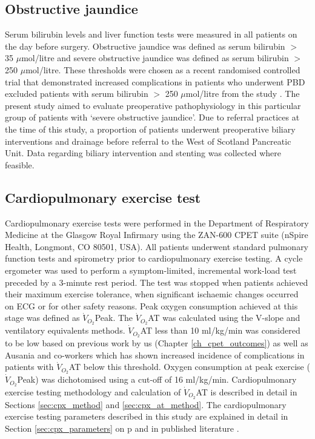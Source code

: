 \subsection{Obstructive jaundice}
Serum bilirubin levels and liver function tests were measured in all patients on the day before surgery. 
Obstructive jaundice was defined as serum bilirubin $>$ 35 $\mu$mol/litre and severe obstructive jaundice was defined as serum bilirubin $>$ 250 $\mu$mol/litre. 
These thresholds were chosen as a recent randomised controlled trial that demonstrated increased complications in patients who underwent PBD excluded patients with serum bilirubin $>$ 250 $\mu$mol/litre from the study \parencite{van_der_gaag_preoperative_2010}.
The present study aimed to evaluate preoperative pathophysiology in this particular group of patients with `severe obstructive jaundice'.
Due to referral practices at the time of this study, a proportion of patients underwent preoperative biliary interventions and drainage before referral to the West of Scotland Pancreatic Unit. 
Data regarding biliary intervention and stenting was collected where feasible.

\subsection{Cardiopulmonary exercise test}
Cardiopulmonary exercise tests were performed in the Department of Respiratory Medicine at the Glasgow Royal Infirmary using the ZAN-600 CPET suite (nSpire Health, Longmont, CO 80501, USA). 
All patients underwent standard pulmonary function tests and spirometry prior to cardiopulmonary exercise testing. 
A cycle ergometer was used to perform a symptom-limited, incremental work-load test preceded by a 3-minute rest period. 
The test was stopped when patients achieved their maximum exercise tolerance, when significant ischaemic changes occurred on ECG or for other safety reasons. 
Peak oxygen consumption achieved at this stage was defined as $\dot{V}_{O_2}$Peak. 
The $\dot{V}_{O_2}$AT was calculated using the V-slope \parencite{beaver_new_1986,sue_metabolic_1988} and ventilatory equivalents \parencite{_ats/accp_2003} methods.
$\dot{V}_{O_2}$AT less than 10 ml/kg/min was considered to be low based on previous work by us (Chapter \ref{ch_cpet_outcomes}) as well as Ausania and co-workers \parencite{ausania_effects_2012} which has shown increased incidence of complications in patients with $\dot{V}_{O_2}$AT below this threshold. 
Oxygen consumption at peak exercise ($\dot{V}_{O_2}$Peak) was dichotomised using a cut-off of 16 ml/kg/min. 
Cardiopulmonary exercise testing methodology and calculation of $\dot{V}_{O_2}$AT is described in detail in Sections \ref{sec:cpx_method} and \ref{sec:cpx_at_method}.
The cardiopulmonary exercise testing parameters described in this study are explained in detail in Section \ref{sec:cpx_parameters} on p\pageref{sec:cpx_parameters} and in published literature \parencite{balady_clinicians_2010}.

